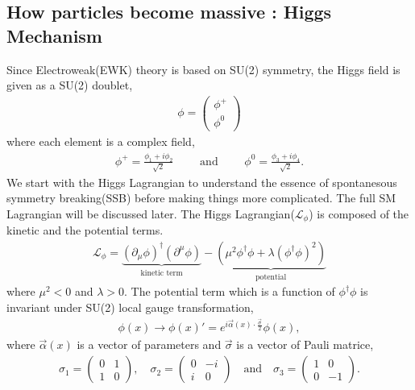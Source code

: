 \subsection{How particles become massive : Higgs Mechanism}
Since Electroweak(EWK) theory is based on SU(2) symmetry, the Higgs field is 
given as a SU(2) doublet, 
\begin{eqnarray} 
\phi = \left(  \begin{array}{c} \phi^+ \\ \phi^0 \end{array} \right)
\end{eqnarray} 
where each element is a complex field, 
\begin{eqnarray} 
\phi^+ = \frac{\phi_1 + i\phi_2}{\sqrt{2}} 
\qquad \textrm{ and } \qquad  
\phi^0 = \frac{\phi_3 + i\phi_4}{\sqrt{2}}.
\end{eqnarray} 
We start with the Higgs Lagrangian to understand the essence of 
spontanesous symmetry breaking(SSB) before making things more 
complicated. The full SM Lagrangian will be discussed later.  
The Higgs Lagrangian($\mathcal{L}_\phi$) is composed of the kinetic 
and the potential terms. 
\begin{eqnarray}
\label{eq:lagHiggs}
\mathcal{L}_\phi 
=
\underbrace{
    \left( \partial_\mu \phi \right)^\dagger \left( \partial^\mu \phi \right)
}_\text{kinetic term} 
- 
\underbrace{
    \left( \mu^2 \phi^\dagger \phi + \lambda \left( \phi^\dagger \phi \right)^2 \right)
}_\text{potential} 
\end{eqnarray} 
where $\mu^2<0$ and $\lambda>0$.
The potential term which is a function of $ \phi^\dagger \phi$ is invariant under 
SU(2) local gauge transformation, 
\begin{eqnarray} 
\phi(x) 
\rightarrow 
\phi(x)' = e^{i \vec{\alpha}(x) \cdot \frac{\vec{\sigma}}{2}} \phi(x),
\end{eqnarray} 
where $\vec{\alpha}(x)$ is a vector of parameters and  
$\vec{\sigma}$ is a vector of Pauli matrice,  
\begin{align*}
\sigma_1 = \begin{pmatrix} 0 & 1\\
                            1 & 0
            \end{pmatrix}, 
\quad 
\sigma_2 = \begin{pmatrix} 0 & -i\\
                            i & 0
            \end{pmatrix}
\quad 
\textrm{and} 
\quad 
\sigma_3 = \begin{pmatrix} 1 & 0\\
                            0 & -1
            \end{pmatrix}.
\end{align*}

